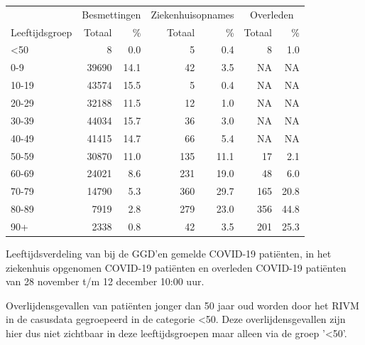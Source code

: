 \documentclass[
  english,
  man,floatsintext]{apa6}
\begin{document}
\begin{table}
\centering\begingroup\fontsize{11}{13}\selectfont

\begin{threeparttable}
\begin{tabular}{lrrrrrr}
\toprule
\multicolumn{1}{c}{ } & \multicolumn{2}{c}{Besmettingen} & \multicolumn{2}{c}{Ziekenhuisopnames} & \multicolumn{2}{c}{Overleden} \\
\cmidrule(l{3pt}r{3pt}){2-3} \cmidrule(l{3pt}r{3pt}){4-5} \cmidrule(l{3pt}r{3pt}){6-7}
Leeftijdsgroep & Totaal & \% & Totaal & \% & Totaal & \%\\
\midrule
<50 & 8 & 0.0 & 5 & 0.4 & 8 & 1.0\\
0-9 & 39690 & 14.1 & 42 & 3.5 & NA & NA\\
10-19 & 43574 & 15.5 & 5 & 0.4 & NA & NA\\
20-29 & 32188 & 11.5 & 12 & 1.0 & NA & NA\\
30-39 & 44034 & 15.7 & 36 & 3.0 & NA & NA\\
40-49 & 41415 & 14.7 & 66 & 5.4 & NA & NA\\
50-59 & 30870 & 11.0 & 135 & 11.1 & 17 & 2.1\\
60-69 & 24021 & 8.6 & 231 & 19.0 & 48 & 6.0\\
70-79 & 14790 & 5.3 & 360 & 29.7 & 165 & 20.8\\
80-89 & 7919 & 2.8 & 279 & 23.0 & 356 & 44.8\\
90+ & 2338 & 0.8 & 42 & 3.5 & 201 & 25.3\\
\bottomrule
\end{tabular}
\begin{tablenotes}
\item[1] Leeftijdsverdeling van bij de GGD’en gemelde COVID-19 patiënten, in het ziekenhuis opgenomen COVID-19 patiënten en overleden COVID-19 patiënten van 28 november t/m 12 december 10:00 uur.
\item[2] Overlijdensgevallen van patiënten jonger dan 50 jaar oud worden door het RIVM in de casusdata gegroepeerd in de categorie <50. Deze overlijdensgevallen zijn hier dus niet zichtbaar in deze leeftijdsgroepen maar alleen via de groep '<50'.
\end{tablenotes}
\end{threeparttable}
\endgroup{}
\end{table}

\newpage
\end{document}
